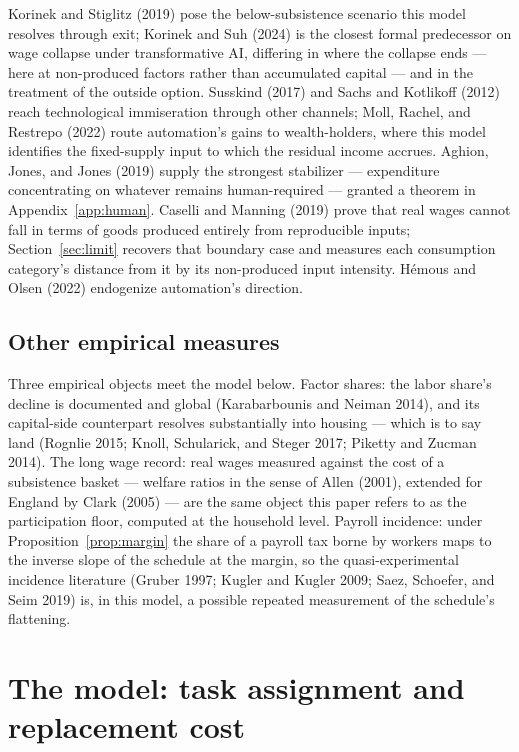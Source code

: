 \documentclass[12pt]{article}
\theoremstyle{plain}
\begin{document}
Korinek and Stiglitz (2019) pose the below-subsistence scenario this model resolves through exit; Korinek and Suh (2024) is the closest formal predecessor on wage collapse under transformative AI, differing in where the collapse ends --- here at non-produced factors rather than accumulated capital --- and in the treatment of the outside option. Susskind (2017) and Sachs and Kotlikoff (2012) reach technological immiseration through other channels; Moll, Rachel, and Restrepo (2022) route automation's gains to wealth-holders, where this model identifies the fixed-supply input to which the residual income accrues. Aghion, Jones, and Jones (2019) supply the strongest stabilizer --- expenditure concentrating on whatever remains human-required --- granted a theorem in Appendix~\ref{app:human}. Caselli and Manning (2019) prove that real wages cannot fall in terms of goods produced entirely from reproducible inputs; Section~\ref{sec:limit} recovers that boundary case and measures each consumption category's distance from it by its non-produced input intensity. Hémous and Olsen (2022) endogenize automation's direction.

\subsection{Other empirical measures}\label{sec:data}

Three empirical objects meet the model below. Factor shares: the labor share's decline is documented and global (Karabarbounis and Neiman 2014), and its capital-side counterpart resolves substantially into housing --- which is to say land (Rognlie 2015; Knoll, Schularick, and Steger 2017; Piketty and Zucman 2014). The long wage record: real wages measured against the cost of a subsistence basket --- welfare ratios in the sense of Allen (2001), extended for England by Clark (2005) --- are the same object this paper refers to as the participation floor, computed at the household level. Payroll incidence: under Proposition~\ref{prop:margin} the share of a payroll tax borne by workers maps to the inverse slope of the schedule at the margin, so the quasi-experimental incidence literature (Gruber 1997; Kugler and Kugler 2009; Saez, Schoefer, and Seim 2019) is, in this model, a possible repeated measurement of the schedule's flattening.

\section{The model: task assignment and replacement cost}\label{sec:model}
\end{document}
